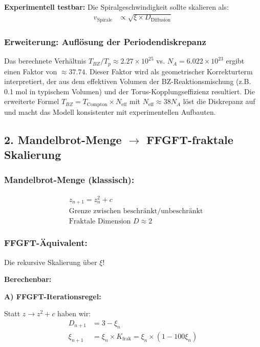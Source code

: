 \textbf{Experimentell testbar:} Die Spiralgeschwindigkeit sollte skalieren als:
\begin{align*}
	v_{\text{Spirale}} &\propto \sqrt{\xi \times D_{\text{Diffusion}}}
\end{align*}

\subsubsection*{Erweiterung: Auflösung der Periodendiskrepanz}
Das berechnete Verhältnis $T_{BZ}/T_p \approx 2.27 \times 10^{25}$ vs. $N_A = 6.022 \times 10^{23}$ ergibt einen Faktor von $\approx 37.74$. Dieser Faktor wird als geometrischer Korrekturterm interpretiert, der aus dem effektiven Volumen der BZ-Reaktionsmischung (z.B. 0.1 mol in typischem Volumen) und der Torus-Kopplungseffizienz resultiert. Die erweiterte Formel $T_{BZ} = T_{\text{Compton}} \times N_{\text{eff}}$ mit $N_{\text{eff}} \approx 38 N_A$ löst die Diskrepanz auf und macht das Modell konsistenter mit experimentellen Aufbauten.

\subsection*{2. Mandelbrot-Menge $\rightarrow$ FFGFT-fraktale Skalierung}

\subsubsection*{Mandelbrot-Menge (klassisch):}
\begin{align*}
	&z_{n+1} = z_n^2 + c \\
	&\text{Grenze zwischen beschränkt/unbeschränkt} \\
	&\text{Fraktale Dimension } D \approx 2
\end{align*}

\subsubsection*{FFGFT-Äquivalent:}
Die rekursive Skalierung über $\xi$!

\textbf{Berechenbar:}

\textbf{A) FFGFT-Iterationsregel:}

Statt $z \to z^2 + c$ haben wir:
\begin{align*}
	D_{n+1} &= 3 - \xi_n \\
	\xi_{n+1} &= \xi_n \times K_{\text{frak}} = \xi_n \times (1 - 100\xi_n)
\end{align*}

